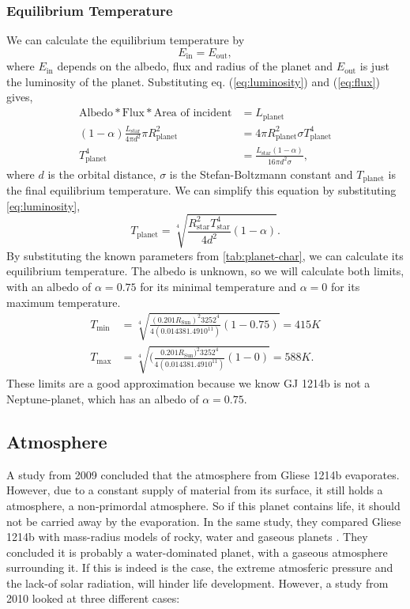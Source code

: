 \documentclass[12pt,a4paper]{article}
\begin{document}
\subsubsection{Equilibrium Temperature}
We can calculate the equilibrium temperature by 
\begin{equation}
    E_{\text{in}} = E_{\text{out}},
\end{equation}
where $E_{\text{in}}$ depends on the albedo, flux and radius of the planet and $E_{\text{out}}$ is just the luminosity of the planet. Substituting eq. (\ref{eq:luminosity}) and (\ref{eq:flux}) gives,
\begin{align}
    \text{Albedo} * \text{Flux} * \text{Area of incident} &= L_{\text{planet}} \\
    (1 - \alpha) \frac{L_{\text{star}}}{4 \pi d^2} \pi R_{\text{planet}}^2 &= 4 \pi R_{\text{planet}}^2 \sigma T_{\text{planet}}^4 \\
    T_{\text{planet}}^4 &= \frac{L_{\text{star}} (1 - \alpha)}{16 \pi d^2 \sigma},
\end{align}
where $d$ is the orbital distance, $\sigma$ is the Stefan-Boltzmann constant and $T_{\text{planet}}$ is the final equilibrium temperature. We can simplify this equation by substituting \ref{eq:luminosity},
\begin{equation}
    T_{\text{planet}} = \sqrt[4]{\frac{R_{\text{star}}^2 T_{\text{star}}^4}{4 d^2} (1 - \alpha)}.
\end{equation}
By substituting the known parameters from \ref{tab:planet-char}, we can calculate its equilibrium temperature. The albedo is unknown, so we will calculate both limits, with an albedo of $\alpha = 0.75$  for its minimal temperature and $\alpha = 0$ for its maximum temperature.
\begin{align*}
    T_{\text{min}} &= \sqrt[4]{\frac{(0.201 R_{\text{Sun}})^2 3252^4}{4 (0.01438 1.49 10^11)} (1 - 0.75)} = 415 K \\
    T_{\text{max}} &= \sqrt[4]{(\frac{0.201 R_{\text{Sun}})^2 3252^4}{4 (0.01438 1.49 10^{11})} (1 - 0)} = 588 K.
\end{align*}
These limits are a good approximation because we know GJ 1214b is not a Neptune-planet, which has an albedo of $\alpha = 0.75$.

\subsection{Atmosphere}
A study from 2009 concluded that the atmosphere from Gliese 1214b evaporates. However, due to a constant supply of material from its surface, it still holds a atmosphere, a non-primordal atmosphere\cite{Charbonneau_2009}. So if this planet contains life, it should not be carried away by the evaporation.
In the same study, they compared Gliese 1214b with mass-radius models of rocky, water and gaseous planets \cite{Charbonneau_2009}. They concluded it is probably a water-dominated planet, with a gaseous atmosphere surrounding it. If this is indeed is the case, the extreme atmosferic pressure and the lack-of solar radiation, will hinder life development. However, a study from 2010 looked at three different cases:  \cite{Rogers_2010}
\end{document}
